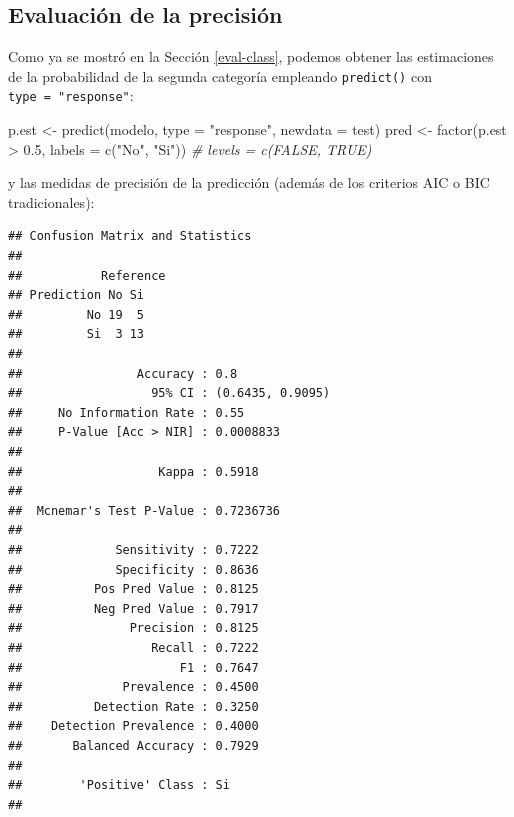 \documentclass[
  spanish,
]{book}
\newenvironment{Shaded}{\begin{snugshade}}{\end{snugshade}}
\newcommand{\AttributeTok}[1]{\textcolor[rgb]{0.77,0.63,0.00}{#1}}
\newcommand{\CommentTok}[1]{\textcolor[rgb]{0.56,0.35,0.01}{\textit{#1}}}
\newcommand{\FloatTok}[1]{\textcolor[rgb]{0.00,0.00,0.81}{#1}}
\newcommand{\FunctionTok}[1]{\textcolor[rgb]{0.00,0.00,0.00}{#1}}
\newcommand{\NormalTok}[1]{#1}
\newcommand{\OtherTok}[1]{\textcolor[rgb]{0.56,0.35,0.01}{#1}}
\newcommand{\SpecialCharTok}[1]{\textcolor[rgb]{0.00,0.00,0.00}{#1}}
\newcommand{\StringTok}[1]{\textcolor[rgb]{0.31,0.60,0.02}{#1}}
\theoremstyle{break}
\theoremstyle{definition}
\theoremstyle{definition}
\theoremstyle{definition}
\theoremstyle{definition}
\theoremstyle{remark}
\begin{document}
\hypertarget{evaluaciuxf3n-de-la-precisiuxf3n-1}{%
\subsection{Evaluación de la precisión}\label{evaluaciuxf3n-de-la-precisiuxf3n-1}}

Como ya se mostró en la Sección \ref{eval-class}, podemos obtener las estimaciones de la probabilidad de la segunda categoría empleando \texttt{predict()} con \texttt{type\ =\ "response"}:

\begin{Shaded}
\begin{Highlighting}[]
\NormalTok{p.est }\OtherTok{\textless{}{-}} \FunctionTok{predict}\NormalTok{(modelo, }\AttributeTok{type =} \StringTok{"response"}\NormalTok{, }\AttributeTok{newdata =}\NormalTok{ test)}
\NormalTok{pred }\OtherTok{\textless{}{-}} \FunctionTok{factor}\NormalTok{(p.est }\SpecialCharTok{\textgreater{}} \FloatTok{0.5}\NormalTok{, }\AttributeTok{labels =} \FunctionTok{c}\NormalTok{(}\StringTok{"No"}\NormalTok{, }\StringTok{"Si"}\NormalTok{)) }\CommentTok{\# levels = c(\textquotesingle{}FALSE\textquotesingle{}, \textquotesingle{}TRUE\textquotesingle{})}
\end{Highlighting}
\end{Shaded}

y las medidas de precisión de la predicción (además de los criterios AIC o BIC tradicionales):

\begin{Shaded}
\end{Shaded}

\begin{verbatim}
## Confusion Matrix and Statistics
## 
##           Reference
## Prediction No Si
##         No 19  5
##         Si  3 13
##                                           
##                Accuracy : 0.8             
##                  95% CI : (0.6435, 0.9095)
##     No Information Rate : 0.55            
##     P-Value [Acc > NIR] : 0.0008833       
##                                           
##                   Kappa : 0.5918          
##                                           
##  Mcnemar's Test P-Value : 0.7236736       
##                                           
##             Sensitivity : 0.7222          
##             Specificity : 0.8636          
##          Pos Pred Value : 0.8125          
##          Neg Pred Value : 0.7917          
##               Precision : 0.8125          
##                  Recall : 0.7222          
##                      F1 : 0.7647          
##              Prevalence : 0.4500          
##          Detection Rate : 0.3250          
##    Detection Prevalence : 0.4000          
##       Balanced Accuracy : 0.7929          
##                                           
##        'Positive' Class : Si              
## 
\end{verbatim}
\end{document}

